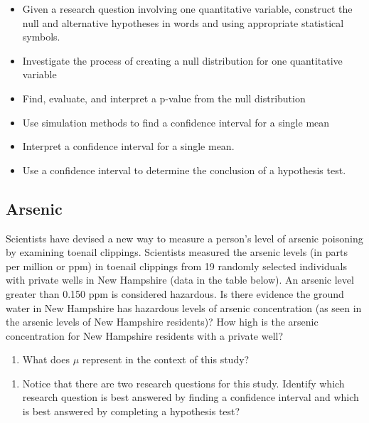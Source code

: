\documentclass[
]{report}
\providecommand{\tightlist}{%
  \setlength{\itemsep}{0pt}\setlength{\parskip}{0pt}}
\begin{document}
\begin{itemize}
\item
  Given a research question involving one quantitative variable, construct the null and alternative hypotheses
  in words and using appropriate statistical symbols.
\item
  Investigate the process of creating a null distribution for one quantitative variable
\item
  Find, evaluate, and interpret a p-value from the null distribution
\item
  Use simulation methods to find a confidence interval for a single mean
\item
  Interpret a confidence interval for a single mean.
\item
  Use a confidence interval to determine the conclusion of a hypothesis test.
\end{itemize}

\subsection{Arsenic}\label{arsenic}

Scientists have devised a new way to measure a person's level of arsenic poisoning by examining toenail clippings. Scientists measured the arsenic levels (in parts per million or ppm) in toenail clippings from 19 randomly selected individuals with private wells in New Hampshire (data in the table below). An arsenic level greater than 0.150 ppm is considered hazardous. Is there evidence the ground water in New Hampshire has hazardous levels of arsenic concentration (as seen in the arsenic levels of New Hampshire residents)? How high is the arsenic concentration for New Hampshire residents with a private well?

\begin{enumerate}
\def\labelenumi{\arabic{enumi}.}
\tightlist
\item
  What does \(\mu\) represent in the context of this study?
\end{enumerate}

\vspace{0.8in}

\begin{enumerate}
\def\labelenumi{\arabic{enumi}.}
\setcounter{enumi}{1}
\tightlist
\item
  Notice that there are two research questions for this study. Identify which research question is best answered by finding a confidence interval and which is best answered by completing a hypothesis test?
\end{enumerate}
\end{document}
